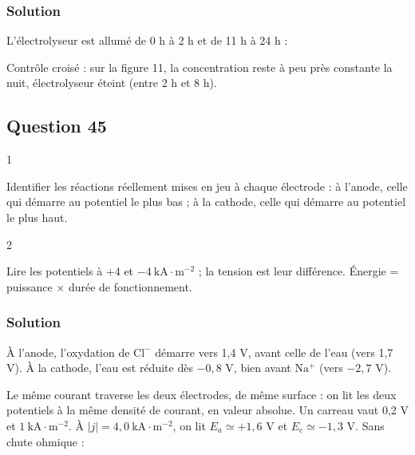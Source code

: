 \documentclass[11pt,a4paper]{article}
\newcommand{\equationajustee}[1]{%
  \sbox{\boiteequation}{$\displaystyle #1$}%
  \ifdim\wd\boiteequation>\linewidth
    \[\resizebox{\linewidth}{!}{\usebox{\boiteequation}}\]%
  \else
    \[#1\]%
  \fi}
\begin{document}
\hypertarget{solution-43}{%
\subsubsection{Solution}\label{solution-43}}

L'électrolyseur est allumé de 0 h à 2 h et de 11 h à 24 h :

\equationajustee{\begin{aligned}
\Delta t_{on}&=2+13\ \text{h}\\
&=15\ \text{h}
\end{aligned}}

\equationajustee{\boxed{\Delta t_{on}=15\ \text{h}}}

Contrôle croisé : sur la figure 11, la concentration reste à peu près constante la nuit, électrolyseur éteint (entre 2 h et 8 h).

\hypertarget{question-45}{%
\subsection{Question 45}\label{question-45}}

\begin{indication}{1}

Identifier les réactions réellement mises en jeu à chaque électrode : à l'anode, celle qui démarre au potentiel le plus bas ; à la cathode, celle qui démarre au potentiel le plus haut.

\end{indication}

\begin{indication}{2}

Lire les potentiels à \(+4\) et \(-4\ \mathrm{kA\cdot m^{-2}}\) ; la tension est leur différence. Énergie = puissance × durée de fonctionnement.

\end{indication}

\hypertarget{solution-44}{%
\subsubsection{Solution}\label{solution-44}}

À l'anode, l'oxydation de \(\mathrm{Cl^-}\) démarre vers 1,4 V, avant celle de l'eau (vers 1,7 V). À la cathode, l'eau est réduite dès \(-0{,}8\) V, bien avant \(\mathrm{Na^+}\) (vers \(-2{,}7\) V).

Le même courant traverse les deux électrodes, de même surface : on lit les deux potentiels à la même densité de courant, en valeur absolue. Un carreau vaut 0,2 V et \(1\ \mathrm{kA\cdot m^{-2}}\). À \(|j|=4{,}0\ \mathrm{kA\cdot m^{-2}}\), on lit \(E_a\simeq+1{,}6\) V et \(E_c\simeq-1{,}3\) V. Sans chute ohmique :
\end{document}
